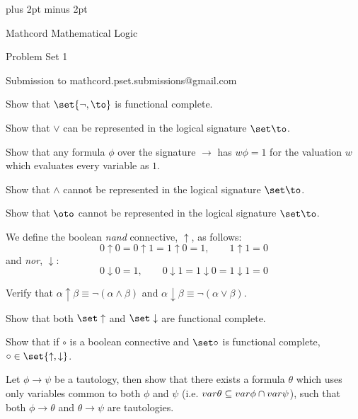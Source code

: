 

\parindent=0pt
\parskip=3pt plus 2pt minus 2pt



\centerline{Mathcord Mathematical Logic}
\centerline{Problem Set 1}
\centerline{Submission to mathcord.pset.submissions@gmail.com}

\bprob

    \benum
        \item Show that $\set{\neg,\to}$ is functional complete.
        \item Show that $\lor$ can be represented in the logical signature $\set\to$.
        \item Show that any formula $\phi$ over the signature $\to$ has $w\phi=1$ for the
        valuation $w$ which evaluates every variable as $1$.
        \item Show that $\land$ cannot be represented in the logical signature $\set\to$.
        \item Show that $\oto$ cannot be represented in the logical signature $\set\to$.
    \eenum

\eprob

\bprob

    We define the boolean {\it nand} connective, $\uparrow$, as follows:
    $$ 0\uparrow0 = 0\uparrow1 = 1\uparrow0 = 1,\qquad 1\uparrow1 = 0 $$
    and {\it nor}, $\downarrow$:
    $$ 0\downarrow0 = 1,\qquad 0\downarrow1 = 1\downarrow0 = 1\downarrow1 = 0 $$
    \benum
        \item Verify that $\alpha\uparrow\beta\equiv\neg(\alpha\land\beta)$ and
        $\alpha\downarrow\beta\equiv\neg(\alpha\lor\beta)$.
        \item Show that both $\set\uparrow$ and $\set\downarrow$ are functional complete.
        \item Show that if $\circ$ is a boolean connective and $\set\circ$ is functional
        complete, $\circ\in\set{\uparrow,\downarrow}$.
    \eenum

\eprob

\bprob

    Let $\phi\to\psi$ be a tautology, then show that there exists a formula $\theta$ which uses
    only variables common to both $\phi$ and $\psi$ (i.e.
    ${\sl var}\theta\subseteq{\sl var}\phi\cap{\sl var}\psi$), such that both $\phi\to\theta$ and $\theta\to\psi$
    are tautologies.

\eprob

